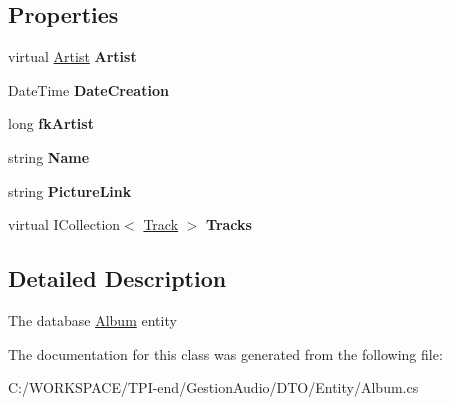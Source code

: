 \subsection*{Properties}
\begin{DoxyCompactItemize}
\item 
\mbox{\label{class_d_t_o_1_1_entity_1_1_album_a2e3b69ce750bfc558534a97f56f561af}} 
virtual \hyperlink{class_d_t_o_1_1_entity_1_1_artist}{Artist} {\bfseries Artist}
\item 
\mbox{\label{class_d_t_o_1_1_entity_1_1_album_a73f0921d2d0b9f5cf9c5052e6de73eb6}} 
Date\+Time {\bfseries Date\+Creation}
\item 
\mbox{\label{class_d_t_o_1_1_entity_1_1_album_a803020baf473a40b224e7edf9c89b4e1}} 
long {\bfseries fk\+Artist}
\item 
\mbox{\label{class_d_t_o_1_1_entity_1_1_album_ab9b2ef7036e68ba646c80f81ffff62f1}} 
string {\bfseries Name}
\item 
\mbox{\label{class_d_t_o_1_1_entity_1_1_album_acd55913e832e38bde01dbe6b6c53c387}} 
string {\bfseries Picture\+Link}
\item 
\mbox{\label{class_d_t_o_1_1_entity_1_1_album_a25b6b9b11765125899d7d3a05905d6b7}} 
virtual I\+Collection$<$ \hyperlink{class_d_t_o_1_1_entity_1_1_track}{Track} $>$ {\bfseries Tracks}
\end{DoxyCompactItemize}


\subsection{Detailed Description}
The database \hyperlink{class_d_t_o_1_1_entity_1_1_album}{Album} entity 



The documentation for this class was generated from the following file\+:\begin{DoxyCompactItemize}
\item 
C\+:/\+W\+O\+R\+K\+S\+P\+A\+C\+E/\+T\+P\+I-\/end/\+Gestion\+Audio/\+D\+T\+O/\+Entity/Album.\+cs\end{DoxyCompactItemize}
